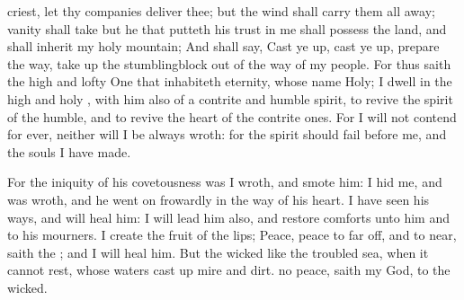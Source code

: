 {criest, let thy
companies
deliver thee; but the
wind shall carry them all
away;
vanity shall
take
{} but he that putteth his
trust in me shall
possess the
land, and shall
inherit my
holy
mountain;
And shall
say, Cast ye
up, cast ye
up,
prepare the
way, take
up the
stumblingblock out of the
way of my
people.
For thus
saith the
high and lofty
One that
inhabiteth
eternity, whose
name
{}
Holy; I
dwell in the
high and
holy
{}, with him also
{} of a
contrite and
humble
spirit, to
revive the
spirit of the
humble, and to
revive the
heart of the contrite
ones.
For I will not
contend for
ever, neither will I be
always
wroth: for the
spirit should
fail
before me, and the
souls
{} I have
made.
\par }{\PP {}For the
iniquity of his
covetousness was I
wroth, and
smote him: I
hid me, and was
wroth, and he went
on
frowardly in the
way of his
heart.
I have
seen his
ways, and will
heal him: I will
lead him also, and
restore
comforts unto him and to his
mourners.
I
create the
fruit of the
lips;
Peace,
peace to
{} far
off, and to
{}
near,
saith the
{}; and I will
heal him.
But the
wicked
{} like the
troubled
sea, when it
cannot
rest, whose
waters cast
up
mire and
dirt.
 no
peace,
saith my
God, to the
wicked.

}
